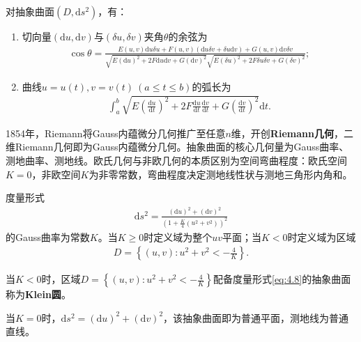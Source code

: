\documentclass[../../main.tex]{subfiles}%
\begin{document}
\begin{proposition}
对抽象曲面$(D,\mathrm{d}s^2)$，有：
\begin{enumerate}[(1)]
\item 切向量$(\mathrm{d}u,\mathrm{d}v)$与$(\delta u,\delta v)$夹角$\theta$的余弦为
\begin{align}
\cos\theta=\frac{E(u,v)\mathrm{d}u\delta u+F(u,v)(\mathrm{d}u\delta v+\delta u\mathrm{d}v)+G(u,v)\mathrm{d}v\delta v}{\sqrt{E(\mathrm{d}u)^2+2F\mathrm{d}u\mathrm{d}v+G(\mathrm{d}v)^2}\sqrt{E(\delta u)^2+2F\delta u\delta v+G(\delta v)^2}};\label{eq:4.6}
\end{align}
\item 曲线$u=u(t),v=v(t)\ (a\leqslant t\leqslant b)$的弧长为
\begin{align}
\int_{a}^{b}\sqrt{E\left(\frac{\mathrm{d}u}{\mathrm{d}t}\right)^2+2F\frac{\mathrm{d}u}{\mathrm{d}t}\frac{\mathrm{d}v}{\mathrm{d}t}+G\left(\frac{\mathrm{d}v}{\mathrm{d}t}\right)^2}\mathrm{d}t.\label{eq:4.7}
\end{align}
\end{enumerate}
\end{proposition}

\begin{remark}
1854年，Riemann将Gauss内蕴微分几何推广至任意$n$维，开创\textbf{Riemann几何}，二维Riemann几何即为Gauss内蕴微分几何。抽象曲面的核心几何量为Gauss曲率、测地曲率、测地线。欧氏几何与非欧几何的本质区别为空间弯曲程度：欧氏空间$K=0$，非欧空间$K$为非零常数，弯曲程度决定测地线性状与测地三角形内角和。
\end{remark}

\begin{proposition}
度量形式
\begin{align}
\mathrm{d}s^2=\frac{(\mathrm{d}u)^2+(\mathrm{d}v)^2}{\left(1+\frac{K}{4}(u^2+v^2)\right)^2}\label{eq:4.8}
\end{align}
的Gauss曲率为常数$K$。当$K\geqslant0$时定义域为整个$uv$平面；当$K<0$时定义域为区域
\begin{align*}
D=\left\{(u,v):u^2+v^2<-\frac{4}{K}\right\}.
\end{align*}
\end{proposition}

\begin{definition}
当$K<0$时，区域$D=\left\{(u,v):u^2+v^2<-\frac{4}{K}\right\}$配备度量形式\eqref{eq:4.8}的抽象曲面称为\textbf{Klein圆}。
\end{definition}

\begin{example}
当$K=0$时，$\mathrm{d}s^2=(\mathrm{d}u)^2+(\mathrm{d}v)^2$，该抽象曲面即为普通平面，测地线为普通直线。
\end{example}
\end{document}
